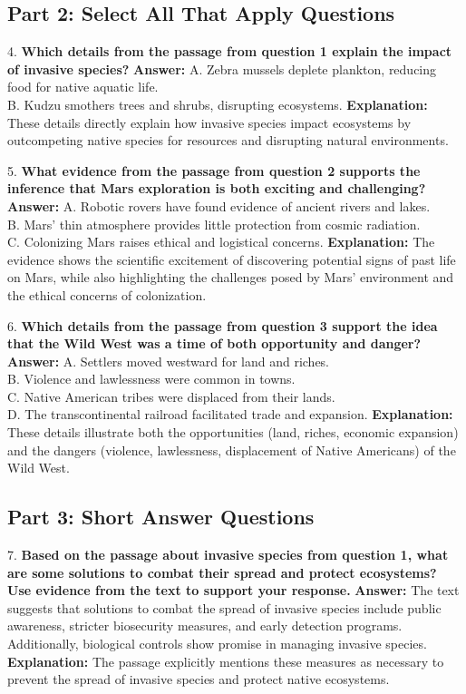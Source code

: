 \documentclass[12pt]{article}
\begin{document}
\subsection*{Part 2: Select All That Apply Questions}

4. \textbf{Which details from the passage from question 1 explain the impact of invasive species?}  
\textbf{Answer:} A. Zebra mussels deplete plankton, reducing food for native aquatic life. \\
B. Kudzu smothers trees and shrubs, disrupting ecosystems.  
\textbf{Explanation:} These details directly explain how invasive species impact ecosystems by outcompeting native species for resources and disrupting natural environments.

\vspace{1cm}
5. \textbf{What evidence from the passage from question 2 supports the inference that Mars exploration is both exciting and challenging?}  
\textbf{Answer:} A. Robotic rovers have found evidence of ancient rivers and lakes. \\
B. Mars’ thin atmosphere provides little protection from cosmic radiation. \\
C. Colonizing Mars raises ethical and logistical concerns.  
\textbf{Explanation:} The evidence shows the scientific excitement of discovering potential signs of past life on Mars, while also highlighting the challenges posed by Mars' environment and the ethical concerns of colonization.

\vspace{1cm}
6. \textbf{Which details from the passage from question 3 support the idea that the Wild West was a time of both opportunity and danger?}  
\textbf{Answer:} A. Settlers moved westward for land and riches. \\
B. Violence and lawlessness were common in towns. \\
C. Native American tribes were displaced from their lands. \\
D. The transcontinental railroad facilitated trade and expansion.  
\textbf{Explanation:} These details illustrate both the opportunities (land, riches, economic expansion) and the dangers (violence, lawlessness, displacement of Native Americans) of the Wild West.

\subsection*{Part 3: Short Answer Questions}

7. \textbf{Based on the passage about invasive species from question 1, what are some solutions to combat their spread and protect ecosystems? Use evidence from the text to support your response.}  
\textbf{Answer:} The text suggests that solutions to combat the spread of invasive species include public awareness, stricter biosecurity measures, and early detection programs. Additionally, biological controls show promise in managing invasive species.  
\textbf{Explanation:} The passage explicitly mentions these measures as necessary to prevent the spread of invasive species and protect native ecosystems.
\end{document}
